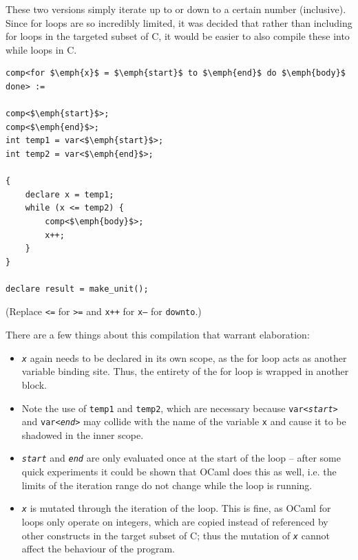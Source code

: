 These two versions simply iterate up to or down to a certain number 
(inclusive). Since for loops are so incredibly limited, it was decided 
that rather than including for loops in the targeted subset of C, it would be 
easier to also compile these into while loops in C.

\begin{lstlisting}
comp<for $\emph{x}$ = $\emph{start}$ to $\emph{end}$ do $\emph{body}$ done> :=

comp<$\emph{start}$>;
comp<$\emph{end}$>;
int temp1 = var<$\emph{start}$>;
int temp2 = var<$\emph{end}$>;

{
    declare x = temp1;
    while (x <= temp2) {
        comp<$\emph{body}$>;
        x++;
    }
}

declare result = make_unit();
\end{lstlisting}

(Replace \texttt{<=} for \texttt{>=} and \texttt{x++} for \texttt{x--} for 
\texttt{downto}.)

There are a few things about this compilation that warrant elaboration:
\begin{itemize}

\item \texttt{\emph{x}} again needs to be declared in its own scope, as the for
    loop acts as another variable binding site. Thus, the entirety of the for
    loop is wrapped in another block.

\item Note the use of \texttt{temp1} and \texttt{temp2}, which are necessary
    because \texttt{var<\emph{start}>} and \texttt{var<\emph{end}>} may collide
    with the name of the variable \texttt{x} and cause it to be shadowed in the
    inner scope.

\item \texttt{\emph{start}} and \texttt{\emph{end}} are only evaluated once at
    the start of the loop -- after some quick experiments it could be shown that
    OCaml does this as well, i.e. the limits of the iteration range do not
    change while the loop is running.

\item \texttt{\emph{x}} is mutated through the iteration of the loop. This is
    fine, as OCaml for loops only operate on integers, which are copied instead
    of referenced by other constructs in the target subset of C; thus the
    mutation of \texttt{\emph{x}} cannot affect the behaviour of the program.

\end{itemize}

